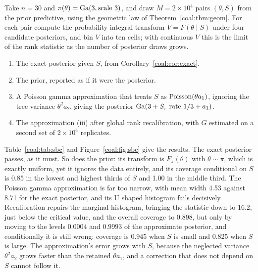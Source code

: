 \begin{example}\label{coal:ex:sbc}
Take $n=30$ and $\pi(\theta)=\mathrm{Ga}(3,\text{scale }3)$, and draw $M=2\times10^4$ pairs $(\theta,S)$ from the prior predictive, using the geometric law of Theorem~\ref{coal:thm:geom}. For each pair compute the probability integral transform $V=F(\theta\mid S)$ under four candidate posteriors, and bin $V$ into ten cells; with continuous $V$ this is the limit of the rank statistic as the number of posterior draws grows.
\begin{enumerate}[label=(\roman*),leftmargin=2em,itemsep=1pt]
\item The exact posterior given $S$, from Corollary~\ref{coal:cor:exact}.
\item The prior, reported as if it were the posterior.
\item A Poisson gamma approximation that treats $S$ as $\mathrm{Poisson}(\theta a_1)$, ignoring the tree variance $\theta^2a_2$, giving the posterior $\mathrm{Ga}(3+S,\ \text{rate }1/3+a_1)$.
\item The approximation (iii) after global rank recalibration, with $G$ estimated on a second set of $2\times10^4$ replicates.
\end{enumerate}
Table~\ref{coal:tab:sbc} and Figure~\ref{coal:fig:sbc} give the results. The exact posterior passes, as it must. So does the prior: its transform is $F_\pi(\theta)$ with $\theta\sim\pi$, which is exactly uniform, yet it ignores the data entirely, and its coverage conditional on $S$ is 0.85 in the lowest and highest thirds of $S$ and 1.00 in the middle third. The Poisson gamma approximation is far too narrow, with mean width 4.53 against 8.71 for the exact posterior, and its U shaped histogram fails decisively. Recalibration repairs the marginal histogram, bringing the statistic down to 16.2, just below the critical value, and the overall coverage to 0.898, but only by moving to the levels $0.0004$ and $0.9993$ of the approximate posterior, and conditionally it is still wrong: coverage is 0.945 when $S$ is small and 0.825 when $S$ is large. The approximation's error grows with $S$, because the neglected variance $\theta^2a_2$ grows faster than the retained $\theta a_1$, and a correction that does not depend on $S$ cannot follow it.
\end{example}

